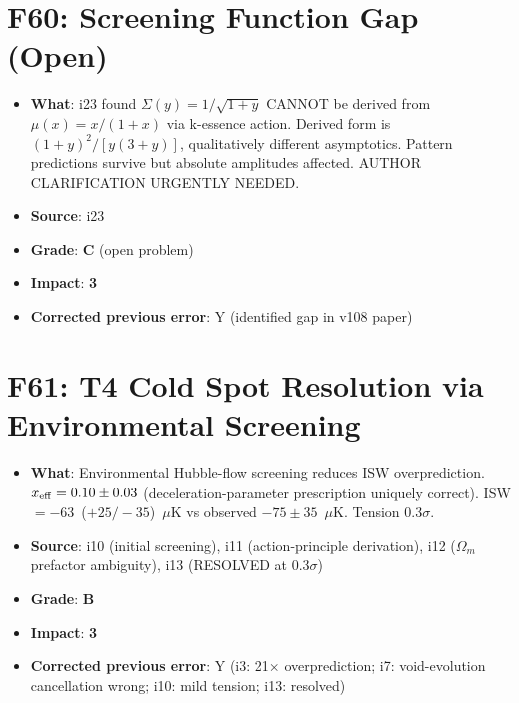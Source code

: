 \documentclass[11pt,a4paper]{article}
\newcommand{\grade}[1]{\textbf{#1}}
\newcommand{\impact}[1]{\textbf{#1}}
\begin{document}
\section{F60: Screening Function Gap (Open)}
\begin{itemize}[nosep]
\item \textbf{What}: i23 found $\Sigma(y) = 1/\sqrt{1+y}$ CANNOT be derived from $\mu(x) = x/(1+x)$ via k-essence action. Derived form is $(1+y)^2/[y(3+y)]$, qualitatively different asymptotics. Pattern predictions survive but absolute amplitudes affected. AUTHOR CLARIFICATION URGENTLY NEEDED.
\item \textbf{Source}: i23
\item \textbf{Grade}: \grade{C} (open problem)
\item \textbf{Impact}: \impact{3}
\item \textbf{Corrected previous error}: Y (identified gap in v108 paper)
\end{itemize}

\section{F61: T4 Cold Spot Resolution via Environmental Screening}
\begin{itemize}[nosep]
\item \textbf{What}: Environmental Hubble-flow screening reduces ISW overprediction. $x_{\rm eff} = 0.10 \pm 0.03$ (deceleration-parameter prescription uniquely correct). ISW $= -63$~($+25/-35$)~$\mu$K vs observed $-75 \pm 35$~$\mu$K. Tension 0.3$\sigma$.
\item \textbf{Source}: i10 (initial screening), i11 (action-principle derivation), i12 ($\Omega_m$ prefactor ambiguity), i13 (RESOLVED at 0.3$\sigma$)
\item \textbf{Grade}: \grade{B}
\item \textbf{Impact}: \impact{3}
\item \textbf{Corrected previous error}: Y (i3: 21$\times$ overprediction; i7: void-evolution cancellation wrong; i10: mild tension; i13: resolved)
\end{itemize}

\end{document}
